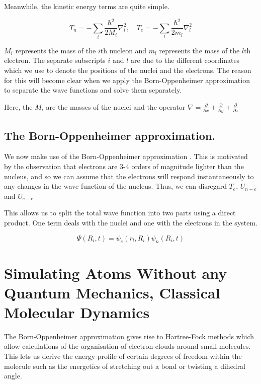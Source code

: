 Meanwhile, the kinetic energy terms are quite simple. 

\begin {equation}
T_n = - \sum_i \frac{\hbar^2}{2M_i} \nabla_i ^2,\quad  T_e = - \sum_l \frac{\hbar^2}{2m_l} \nabla_l ^2
\end {equation}

$M_i$ represents the mass of the $i$th nucleon and $m_l$ represents the mass of the $l$th electron. The separate subscripts $i$ and $l$ are due to the different coordinates which we use to denote the positions of the nuclei and the electrons. The reason for this will become clear when we apply the Born-Oppenheimer approximation to separate the wave functions and solve them separately.

Here, the $M_i$ are the masses of the nuclei and the operator $\nabla = \frac{\partial}{\partial x} + \frac{\partial }{\partial y} + \frac{\partial}{\partial z} $


\subsection{The Born-Oppenheimer approximation.}
We now make use of the Born-Oppenheimer approximation \cite{Born1927}. This is motivated by the observation that electrons are 3-4 orders of magnitude lighter than the nucleus, and so we can assume that the electrons will respond instantaneously to any changes in the wave function of the nucleus. Thus, we can disregard $T_e$, $U_{n-e}$ and $U_{e-e}$ 


This allows us to split the total wave function into two parts using a direct product. One term deals with the nuclei and one with the electrons in the system. 

\begin {equation}
\Psi(R_i,t) = \psi_e (r_l,R_i) \psi_n(R_i,t)
\end {equation}

\section{Simulating Atoms Without any Quantum Mechanics, Classical Molecular Dynamics}
The Born-Oppenheimer approximation gives rise to Hartree-Fock methods which allow calculations of the organisation of electron clouds around small molecules. This lets us derive the energy profile of certain degrees of freedom within the molecule such as the energetics of stretching out a bond or twisting a dihedral angle. 

